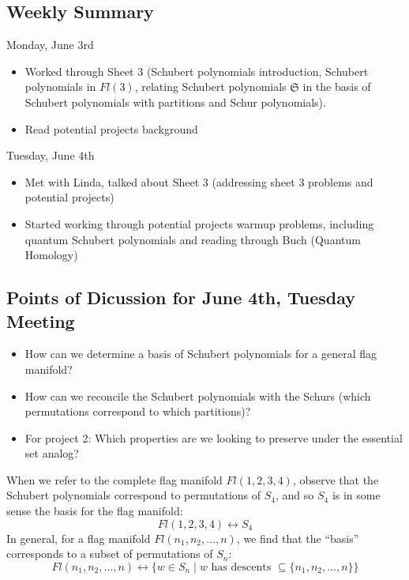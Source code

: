 \subsection{Weekly Summary}

Monday, June 3rd
\begin{itemize}
    \item Worked through Sheet 3 (Schubert polynomials introduction, Schubert polynomials in $Fl(3)$, relating Schubert polynomials $\mathfrak{S}$ in the basis of Schubert polynomials with partitions and Schur polynomials).
    \item Read potential projects background
\end{itemize}

Tuesday, June 4th
\begin{itemize}
    \item Met with Linda, talked about Sheet 3 (addressing sheet 3 problems and potential projects)
    \item Started working through potential projects warmup problems, including quantum Schubert polynomials and reading through Buch (Quantum Homology)
\end{itemize}

\subsection{Points of Dicussion for June 4th, Tuesday Meeting}

\begin{itemize}
    \item How can we determine a basis of Schubert polynomials for a general flag manifold?
    \item How can we reconcile the Schubert polynomials with the Schurs (which permutations correspond to which partitions)?
    \item For project 2: Which properties are we looking to preserve under the essential set analog?
\end{itemize}

When we refer to the complete flag manifold $Fl(1, 2, 3, 4)$, observe that the Schubert polynomials correspond to permutations of $S_4$, and so $S_4$ is in some sense the basis for the flag manifold:
\[
    Fl(1, 2, 3, 4) \leftrightarrow S_4
\]
In general, for a flag manifold $Fl(n_1, n_2, \dots, n)$, we find that the ``basis'' corresponds to a subset of permutations of $S_n$:
\[
    Fl(n_1, n_2, \dots, n) \leftrightarrow \{ w \in S_n \mid w \text{ has descents } \subseteq \{ n_1, n_2, \dots, n\} \}
\]

